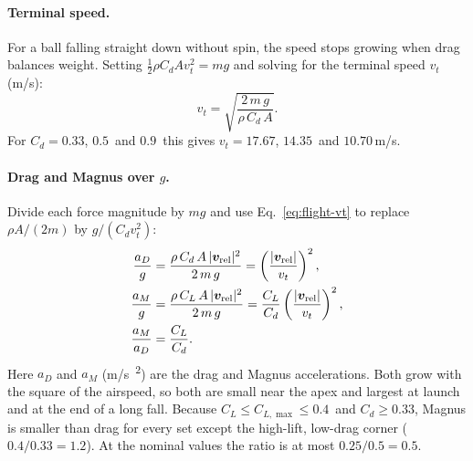\paragraph{Terminal speed.}
For a ball falling straight down without spin, the speed stops growing when drag balances weight.
Setting $\tfrac12\rho C_d A v_t^2 = mg$ and solving for the terminal speed $v_t$ (\unit{m/s}):
\begin{equation}
  v_t = \sqrt{\frac{2\,m\,g}{\rho\,C_d\,A}}.
  \label{eq:flight-vt}
\end{equation}
For $C_d = 0.33$\assumed, $0.5$\assumed\ and $0.9$\assumed\ this gives
$v_t = 17.67$\derived, $14.35$\derived\ and $10.70$\,\unit{m/s}\derived.

\paragraph{Drag and Magnus over $g$.}
Divide each force magnitude by $mg$ and use Eq.~\eqref{eq:flight-vt} to replace $\rho A/(2m)$ by
$g/(C_d v_t^2)$:
\begin{align}
  \frac{a_D}{g} &= \frac{\rho\,C_d\,A\,|\bm{v}_{\mathrm{rel}}|^2}{2\,m\,g}
               = \left(\frac{|\bm{v}_{\mathrm{rel}}|}{v_t}\right)^{2}, \label{eq:flight-aD}\\
  \frac{a_M}{g} &= \frac{\rho\,C_L\,A\,|\bm{v}_{\mathrm{rel}}|^2}{2\,m\,g}
               = \frac{C_L}{C_d}\left(\frac{|\bm{v}_{\mathrm{rel}}|}{v_t}\right)^{2}, \label{eq:flight-aM}\\
  \frac{a_M}{a_D} &= \frac{C_L}{C_d}. \label{eq:flight-ratio}
\end{align}
Here $a_D$ and $a_M$ (\unit{m/s\textsuperscript{2}}) are the drag and Magnus accelerations.
Both grow with the square of the airspeed, so both are small near the apex and largest at launch and
at the end of a long fall.
Because $C_L \le C_{L,\max} \le 0.4$\assumed\ and $C_d \ge 0.33$\assumed, Magnus is smaller than drag
for every set except the high-lift, low-drag corner ($0.4/0.33 = 1.2$\derived).
At the nominal values the ratio is at most $0.25/0.5 = 0.5$\derived.

